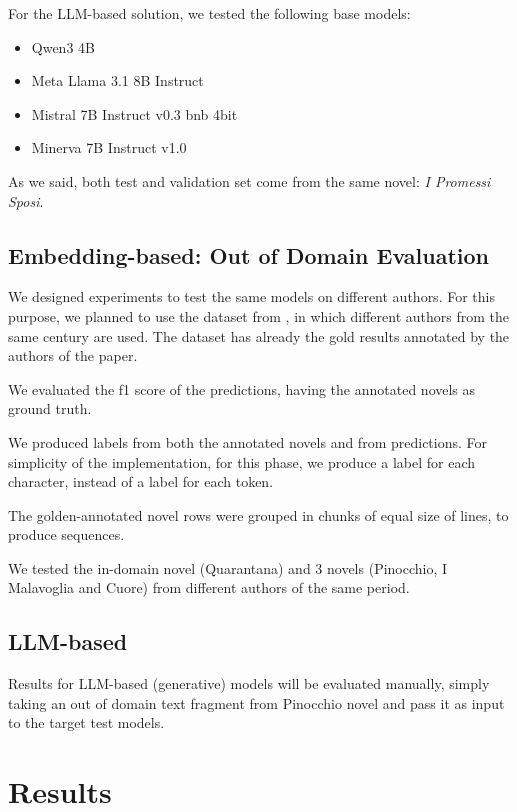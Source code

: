 \documentclass[11pt]{article}
\begin{document}
For the LLM-based solution, we tested the following base models:

 \begin{itemize}
 	\item Qwen3 4B
	\item Meta Llama 3.1 8B Instruct
	\item Mistral 7B Instruct v0.3 bnb 4bit
	\item Minerva 7B Instruct v1.0
\end{itemize}

As we said, both test and validation set come from the same novel: \emph{I Promessi Sposi}. 

\subsection{Embedding-based: Out of Domain Evaluation}

We designed experiments to test the same models on different authors.
For this purpose, we planned to use the dataset from \cite{redaelli-sprugnoli-2024-sentence}, in which different authors
from the same century are used.
The dataset has already the gold results annotated by the authors of the paper.

We evaluated the f1 score of the predictions, having the annotated
novels as ground truth.

We produced labels from both the annotated novels and 
from predictions. For simplicity of the implementation,
for this phase, we produce a label for each character, instead of a label for each token.

The golden-annotated novel rows were grouped in chunks of equal size of lines, to produce sequences.

We tested the in-domain novel (Quarantana) and 3 novels (Pinocchio, I Malavoglia and Cuore) from different authors of the same period.

\subsection{LLM-based}

Results for LLM-based (generative)  models will be evaluated manually, simply taking an out of domain 
text fragment from Pinocchio novel and pass it as input to the target test models.

\section{Results}
\end{document}
